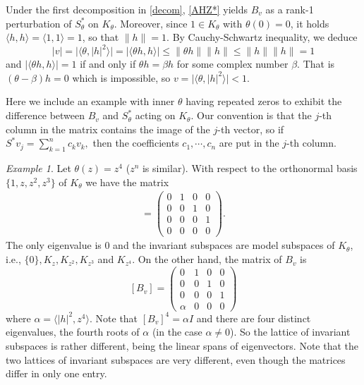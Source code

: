 \documentclass[12pt,reqno]{amsart}
\theoremstyle{definition}
\theoremstyle{remark}
\newtheorem{exm}[thm]{Example}
\numberwithin{equation}{section}
\newcommand{\la}{\langle}
\newcommand{\ra}{\rangle}
\begin{document}
Under the first decomposition in \eqref{decom}, \eqref{AHZ*} yields $B_v$ as a rank-1 perturbation of $S_\theta^*$ on $K_\theta.$ Moreover, since  $1\in K_\theta$ with $\theta(0)=0$, it holds $\la h, h\ra=\la 1, 1\ra=1$, so that $\|h\|=1.$  By Cauchy-Schwartz inequality, we deduce
\[
|v|=\bigl|\langle \theta, |h|^2 \rangle\bigr| = \bigl|\langle \theta h, h \rangle\bigr| \le \|\theta h\| \|h\| \le \|h\| \|h\| = 1
\]
and \( |\langle \theta h, h \rangle| = 1 \) if and only if \( \theta h = \beta h \) for some complex number \( \beta \). That is \( (\theta - \beta)h = 0 \) which is impossible, so \( v=\bigl|\langle \theta, |h|^2 \rangle\bigr| < 1 \).

Here we include an example  with inner $\theta$ having repeated zeros to exhibit the difference between $B_v$ and $S_\theta^*$ acting on $K_\theta.$ Our convention is that the $j$-th column in the matrix contains the image of the $j$-th vector, so if $S^* v_j =\sum_{k=1}^n c_k v_k,$ then the coefficients $c_1, \cdots, c_n$ are put in the $j$-th column.

\begin{exm} Let $\theta(z)=z^4$ ($z^n$ is similar). With respect to the orthonormal basis $\{1, z, z^2, z^3\}$ of $K_\theta$ we have the matrix
\begin{align*} [S_\theta^*]=\left(\begin{array}{cccc}0 &1& 0& 0\\
0& 0& 1& 0\\ 0& 0& 0& 1\\ 0 &0& 0& 0\end{array}\right).\end{align*}
The only eigenvalue is $0$ and the invariant subspaces are model subspaces of $K_\theta$, i.e., $\{0\}, K_z, K_{z^2}, K_{z^3}$ and
$K_{z^4}$. On the other hand, the matrix of $B_v$ is
$$[B_v] = \left(\begin{array}{cccc}0 & 1 & 0& 0\\0& 0& 1 &0\\0& 0 &0& 1\\ \alpha & 0& 0& 0\end{array}\right)$$
where $\alpha=\la |h|^2, z^4\ra$. Note that $[B_v]^4 = \alpha I$ and there are four distinct eigenvalues, the fourth roots
of $\alpha$ (in the case $ \alpha\neq 0$). So the lattice of invariant subspaces is rather different, being the linear spans of eigenvectors.
Note that the two lattices of invariant subspaces are very different, even though the matrices  differ in only one entry.\end{exm}
\end{document}

